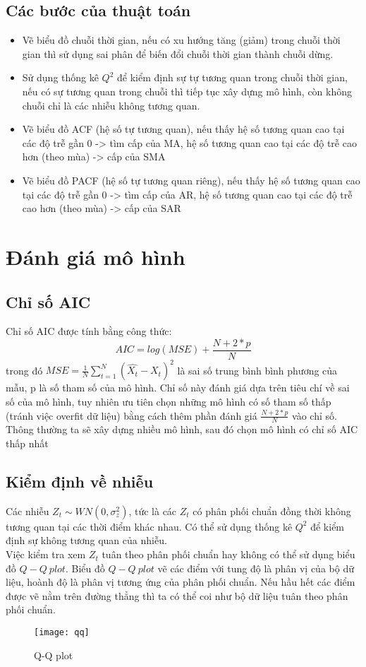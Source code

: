 \documentclass[a4paper, 12pt]{article}
\theoremstyle{plain}
\theoremstyle{definition}
\numberwithin{equation}{section}
\begin{document}
\subsection{Các bước của thuật toán}
\begin{itemize}
	\item Vẽ biểu đồ chuỗi thời gian, nếu có xu hướng tăng (giảm) trong chuỗi thời gian thì sử dụng sai phân để biến đổi chuỗi thời gian thành chuỗi dừng.
	\item Sử dụng thống kê $Q^2$ để kiểm định sự tự tương quan trong chuỗi thời gian, nếu có sự tương quan trong chuỗi thì tiếp tục xây dựng mô hình, còn không chuỗi chỉ là các nhiễu không tương quan.
	\item Vẽ biểu đồ ACF (hệ số tự tương quan), nếu thấy hệ số tương quan cao tại các độ trễ gần 0 -> tìm cấp của MA, hệ số tương quan cao tại các độ trễ cao hơn (theo mùa) -> cấp của SMA
	\item Vẽ biểu đồ PACF (hệ số tự tương quan riêng), nếu thấy hệ số tương quan cao tại các độ trễ gần 0 -> tìm cấp của AR, hệ số tương quan cao tại các độ trễ cao hơn (theo mùa) -> cấp của SAR
\end{itemize}
\section{Đánh giá mô hình}
\subsection{Chỉ số AIC}
	Chỉ số AIC được tính bằng công thức:
	$$AIC = log(MSE) + \frac{N + 2*p}{N}$$
	trong đó $MSE = \frac{1}{N} \sum_{t = 1}^{N} (\hat{X_t} - X_t)^2$ là sai số trung bình bình phương của mẫu, p là số tham số của mô hình. Chỉ số này đánh giá dựa trên tiêu chí về sai số của mô hình, tuy nhiên ưu tiên chọn những mô hình có số tham số thấp (tránh việc overfit dữ liệu) bằng cách thêm phần đánh giá $\frac{N + 2*p}{N}$ vào chỉ số. Thông thường ta sẽ xây dựng nhiều mô hình, sau đó chọn mô hình có chỉ số AIC thấp nhất
\subsection{Kiểm định về nhiễu}
	Các nhiễu $Z_t \sim WN(0, \sigma_z^2)$, tức là các $Z_t$ có phân phối chuẩn đồng thời không tương quan tại các thời điểm khác nhau. Có thể sử dụng thống kê $Q^2$ để kiểm định sự không tương quan của nhiễu.\\
	Việc kiểm tra xem $Z_t$ tuân theo phân phối chuẩn hay không có thể sử dụng biểu đồ $Q-Q \ plot$. Biểu đồ $Q-Q \ plot$ vẽ các điểm với tung độ là phân vị của bộ dữ liệu, hoành độ là phân vị tương ứng của phân phối chuẩn. Nếu hầu hết các điểm được vẽ nằm trên đường thẳng thì ta có thể coi như bộ dữ liệu tuân theo phân phối chuẩn.
	\begin{figure}[H]
	\centering
	\texttt{[image: qq]}
	\caption{Q-Q plot}
	\end{figure}
\end{document}
